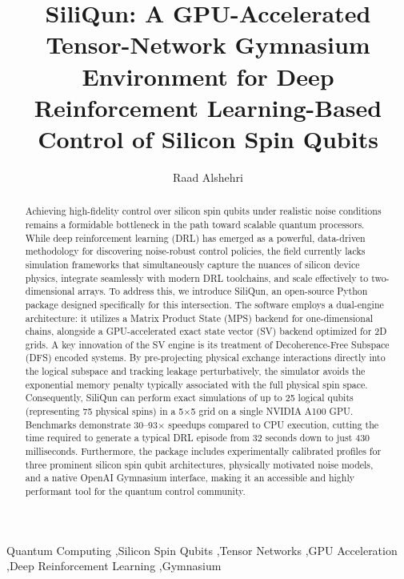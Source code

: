 \documentclass[preprint,12pt, a4paper]{elsarticle}
\begin{document}
\renewcommand{\labelenumii}{\arabic{enumi}.\arabic{enumii}}

\begin{frontmatter}

\title{SiliQun: A GPU-Accelerated Tensor-Network Gymnasium Environment for Deep Reinforcement Learning-Based Control of Silicon Spin Qubits}

\author[label1]{Raad Alshehri}
\address[label1]{Faculty of Computing and Information Technology, King Abdulaziz University, Jeddah 21589, Saudi Arabia}

\begin{abstract}
Achieving high-fidelity control over silicon spin qubits under realistic noise conditions remains a formidable bottleneck in the path toward scalable quantum processors. While deep reinforcement learning (DRL) has emerged as a powerful, data-driven methodology for discovering noise-robust control policies, the field currently lacks simulation frameworks that simultaneously capture the nuances of silicon device physics, integrate seamlessly with modern DRL toolchains, and scale effectively to two-dimensional arrays. To address this, we introduce SiliQun, an open-source Python package designed specifically for this intersection. The software employs a dual-engine architecture: it utilizes a Matrix Product State (MPS) backend for one-dimensional chains, alongside a GPU-accelerated exact state vector (SV) backend optimized for 2D grids. A key innovation of the SV engine is its treatment of Decoherence-Free Subspace (DFS) encoded systems. By pre-projecting physical exchange interactions directly into the logical subspace and tracking leakage perturbatively, the simulator avoids the exponential memory penalty typically associated with the full physical spin space. Consequently, SiliQun can perform exact simulations of up to 25 logical qubits (representing 75 physical spins) in a 5$\times$5 grid on a single NVIDIA A100 GPU. Benchmarks demonstrate 30--93$\times$ speedups compared to CPU execution, cutting the time required to generate a typical DRL episode from 32 seconds down to just 430 milliseconds. Furthermore, the package includes experimentally calibrated profiles for three prominent silicon spin qubit architectures, physically motivated noise models, and a native OpenAI Gymnasium interface, making it an accessible and highly performant tool for the quantum control community.
\end{abstract}

\begin{keyword}
Quantum Computing \sep Silicon Spin Qubits \sep Tensor Networks \sep GPU Acceleration \sep Deep Reinforcement Learning \sep Gymnasium
\end{keyword}

\end{frontmatter}
\end{document}
